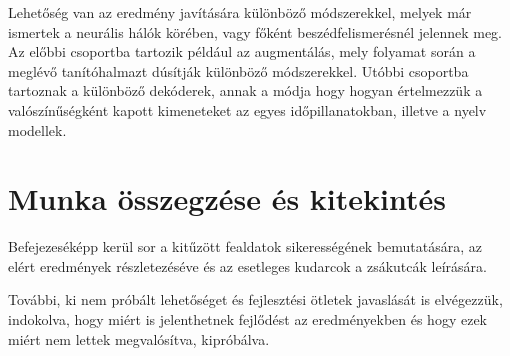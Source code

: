 Lehetőség van az eredmény javítására különböző módszerekkel, melyek már ismertek a neurális hálók körében, vagy főként beszédfelismerésnél jelennek meg. Az előbbi csoportba tartozik például az augmentálás, mely folyamat során a meglévő tanítóhalmazt dúsítják különböző módszerekkel. Utóbbi csoportba tartoznak a különböző dekóderek, annak a módja hogy hogyan értelmezzük a valószínűségként kapott kimeneteket az egyes időpillanatokban, illetve a nyelv modellek.

\section{Munka összegzése és kitekintés}

Befejezeséképp kerül sor a kitűzött fealdatok sikerességének bemutatására, az elért eredmények részletezéséve és az esetleges kudarcok a zsákutcák leírására.

További, ki nem próbált lehetőséget és fejlesztési ötletek javaslását is elvégezzük, indokolva, hogy miért is jelenthetnek fejlődést az eredményekben és hogy ezek miért nem lettek megvalósítva, kipróbálva.
